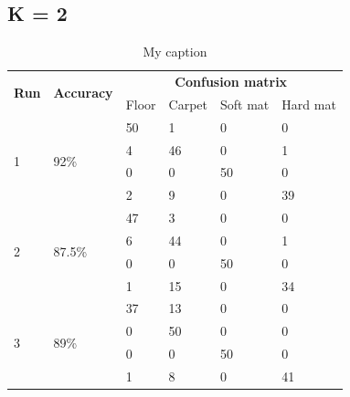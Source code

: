 \documentclass[USenglish]{ifimaster}  %
\begin{document}
\subsection{K = 2}
\begin{table}[h]
	\centering
	\begin{tabular}{llllll}
		\hline
		\multirow{2}{*}{\textbf{Run}} & \multirow{2}{*}{\textbf{Accuracy}} & \multicolumn{4}{c}{\textbf{Confusion matrix}} \\ \cline{3-6} 
		&  & \multicolumn{1}{l|}{Floor} & \multicolumn{1}{l|}{Carpet} & \multicolumn{1}{l|}{Soft mat} & Hard mat \\ \hline
		\multicolumn{1}{l|}{\multirow{4}{*}{1}} & \multicolumn{1}{l|}{\multirow{4}{*}{92\%}} & \multicolumn{1}{l|}{50} & \multicolumn{1}{l|}{1} & \multicolumn{1}{l|}{0} & 0 \\ \cline{3-6} 
		\multicolumn{1}{l|}{} & \multicolumn{1}{l|}{} & \multicolumn{1}{l|}{4} & \multicolumn{1}{l|}{46} & \multicolumn{1}{l|}{0} & 1 \\ \cline{3-6} 
		\multicolumn{1}{l|}{} & \multicolumn{1}{l|}{} & \multicolumn{1}{l|}{0} & \multicolumn{1}{l|}{0} & \multicolumn{1}{l|}{50} & 0 \\ \cline{3-6} 
		\multicolumn{1}{l|}{} & \multicolumn{1}{l|}{} & \multicolumn{1}{l|}{2} & \multicolumn{1}{l|}{9} & \multicolumn{1}{l|}{0} & 39 \\ \hline
		\multicolumn{1}{l|}{\multirow{4}{*}{2}} & \multicolumn{1}{l|}{\multirow{4}{*}{87.5\%}} & \multicolumn{1}{l|}{47} & \multicolumn{1}{l|}{3} & \multicolumn{1}{l|}{0} & 0 \\ \cline{3-6} 
		\multicolumn{1}{l|}{} & \multicolumn{1}{l|}{} & \multicolumn{1}{l|}{6} & \multicolumn{1}{l|}{44} & \multicolumn{1}{l|}{0} & 1 \\ \cline{3-6} 
		\multicolumn{1}{l|}{} & \multicolumn{1}{l|}{} & \multicolumn{1}{l|}{0} & \multicolumn{1}{l|}{0} & \multicolumn{1}{l|}{50} & 0 \\ \cline{3-6} 
		\multicolumn{1}{l|}{} & \multicolumn{1}{l|}{} & \multicolumn{1}{l|}{1} & \multicolumn{1}{l|}{15} & \multicolumn{1}{l|}{0} & 34 \\ \hline
		\multicolumn{1}{l|}{\multirow{4}{*}{3}} & \multicolumn{1}{l|}{\multirow{4}{*}{89\%}} & \multicolumn{1}{l|}{37} & \multicolumn{1}{l|}{13} & \multicolumn{1}{l|}{0} & 0 \\ \cline{3-6} 
		\multicolumn{1}{l|}{} & \multicolumn{1}{l|}{} & \multicolumn{1}{l|}{0} & \multicolumn{1}{l|}{50} & \multicolumn{1}{l|}{0} & 0 \\ \cline{3-6} 
		\multicolumn{1}{l|}{} & \multicolumn{1}{l|}{} & \multicolumn{1}{l|}{0} & \multicolumn{1}{l|}{0} & \multicolumn{1}{l|}{50} & 0 \\ \cline{3-6} 
		\multicolumn{1}{l|}{} & \multicolumn{1}{l|}{} & \multicolumn{1}{l|}{1} & \multicolumn{1}{l|}{8} & \multicolumn{1}{l|}{0} & 41
	\end{tabular}
	\caption{My caption}
	\label{my-label}
\end{table}
\FloatBarrier
\end{document}
